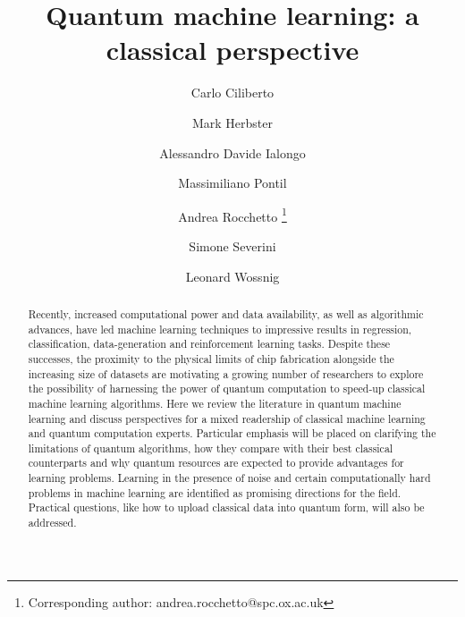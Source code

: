 \documentclass[a4paper, 11pt]{article}
\title{Quantum machine learning: a classical perspective}
\renewcommand{\thefootnote}{\fnsymbol{footnote}}
\begin{document}
\author[1]{Carlo Ciliberto}
\author[1]{Mark Herbster}
\author[2,3]{Alessandro Davide Ialongo}
\author[1,4]{Massimiliano Pontil}
\author[1,5]{Andrea Rocchetto \thanks{Corresponding author: andrea.rocchetto@spc.ox.ac.uk}}
\author[1,6]{Simone Severini}
\author[1,5,7]{Leonard Wossnig}


\date{}
\maketitle
\renewcommand{\thefootnote}{\arabic{footnote}}

\begin{abstract}

Recently, increased computational power and data availability, as well as algorithmic advances, have led machine learning techniques to impressive results in regression, classification, data-generation and reinforcement learning tasks. Despite these successes, the proximity to the physical limits of chip fabrication alongside the increasing size of datasets are motivating a growing number of researchers to explore the possibility of harnessing the power of quantum computation to speed-up classical machine learning algorithms. Here we review the literature in quantum machine learning and discuss perspectives for a mixed readership of classical machine learning and quantum computation experts. Particular emphasis will be placed on clarifying the limitations of quantum algorithms, how they compare with their best classical counterparts and why quantum resources are expected to provide advantages for learning problems. Learning in the presence of noise and certain computationally hard problems in machine learning are identified as promising directions for the field. Practical questions, like how to upload classical data into quantum form, will also be addressed.\\
\end{abstract}

\hypersetup{linkcolor=blue}
\end{document}
